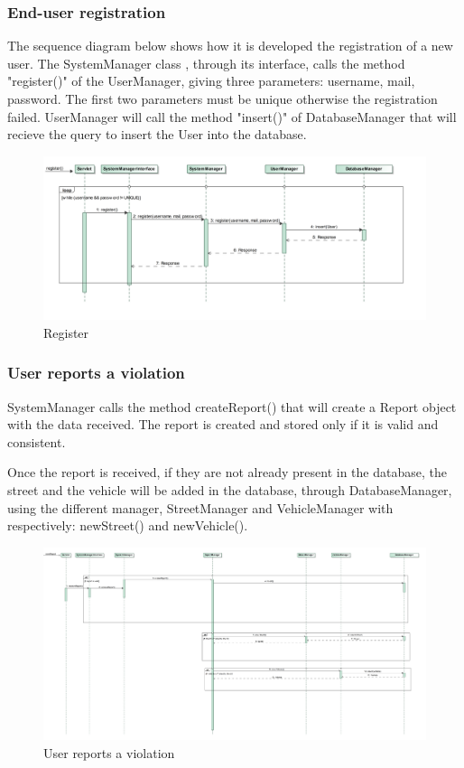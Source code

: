 \subsubsection{End-user registration}
The sequence diagram below shows how it is developed the registration of a new user. The SystemManager class , through its interface, calls  the method "register()" of the UserManager, giving three parameters: username, mail, password. The first two parameters must be unique otherwise the registration failed.
UserManager will call the method "insert()" of DatabaseManager that will recieve the query to insert the User into the database.
\begin{figure}[H]
	\centering
	\includegraphics[width=1\linewidth]{Images/RunTimeDiagram/Sequence1}
	\caption{Register}
	\label{fig:Register}
\end{figure}

\newpage

\subsubsection{User reports a violation}
 SystemManager calls the method createReport() that will create a Report object with the data received. The report is created and stored only if it is valid and consistent. 
 
Once the report is received, if they are not already present in the database, the street and the vehicle will be added in the database, through DatabaseManager, using the different manager, StreetManager and VehicleManager with respectively: newStreet() and newVehicle().
\begin{figure}[H] 
	\centering
	\includegraphics[width=1.1\linewidth]{Images/RunTimeDiagram/Sequence2}
	\caption{User reports a violation}
	\label{fig:User reports a violation}
\end{figure}

